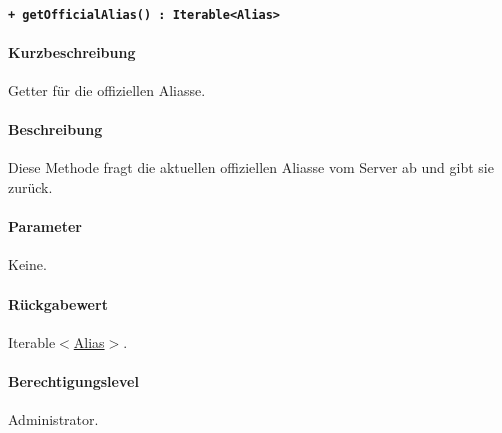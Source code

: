 \paragraph{\texttt{+ getOfficialAlias() : Iterable<Alias>}}\label{AP_Backend_getOfficialAlias}%
\paragraph*{Kurzbeschreibung}
Getter für die offiziellen Aliasse.
\paragraph*{Beschreibung}
Diese Methode fragt die aktuellen offiziellen Aliasse vom Server ab und gibt sie zurück.
\paragraph*{Parameter}
Keine.
\paragraph*{Rückgabewert}
Iterable$<$\hyperref[AP_Alias]{Alias}$>$.
\paragraph*{Berechtigungslevel}
Administrator.